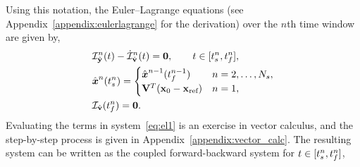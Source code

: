 Using this notation, the Euler--Lagrange equations (see
Appendix~\ref{appendix:eulerlagrange} for the derivation) over the $n$th
time window are given by, 
\begin{equation}\label{eq:el1} 
\begin{split}
& \mathcal{I}_{ \hat{\mathbf{y}}}^n(t) - \dot{\mathcal{I}}_{ \hat{\mathbf{v}}}^n(t )  = \boldsymbol 0, \qquad t \in [t_s^{n},t_f^{n}],\\ 
&\hat{ \boldsymbol x}^n(t_s^{n})  = \begin{cases} 
\hat{ \boldsymbol x}^{n-1}(t_f^{n-1}) &
n=2,\ldots,N_s, \\ 
\mathbf {V}^T({{\mathbf{x}}_0} - \mathbf{x}_\text{ref}) & n=1,
\end{cases}\\ 
&\mathcal{I}_{ \hat{\mathbf{v}}} (t_f^{n}) = \boldsymbol 0.
\end{split} 
\end{equation}
Evaluating the terms in system~\eqref{eq:el1} is an exercise in
vector calculus, and the step-by-step process is given in
Appendix~\ref{appendix:vector_calc}. The resulting system can be written as the 
coupled forward-backward system for $t \in [t_s^{n},t_f^{n} ]$,
